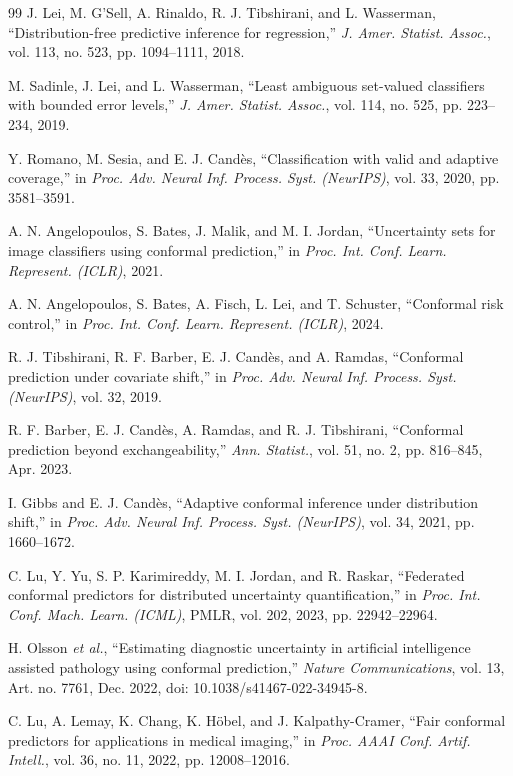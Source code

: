 \documentclass[journal]{IEEEtran}
\begin{document}
\begin{thebibliography}{99}
 J. Lei, M. G'Sell, A. Rinaldo, R. J. Tibshirani, and L. Wasserman, ``Distribution-free predictive inference for regression,'' \emph{J. Amer. Statist. Assoc.}, vol. 113, no. 523, pp. 1094--1111, 2018.

 M. Sadinle, J. Lei, and L. Wasserman, ``Least ambiguous set-valued classifiers with bounded error levels,'' \emph{J. Amer. Statist. Assoc.}, vol. 114, no. 525, pp. 223--234, 2019.

 Y. Romano, M. Sesia, and E. J. Cand\`{e}s, ``Classification with valid and adaptive coverage,'' in \emph{Proc. Adv. Neural Inf. Process. Syst. (NeurIPS)}, vol. 33, 2020, pp. 3581--3591.

 A. N. Angelopoulos, S. Bates, J. Malik, and M. I. Jordan, ``Uncertainty sets for image classifiers using conformal prediction,'' in \emph{Proc. Int. Conf. Learn. Represent. (ICLR)}, 2021.

 A. N. Angelopoulos, S. Bates, A. Fisch, L. Lei, and T. Schuster, ``Conformal risk control,'' in \emph{Proc. Int. Conf. Learn. Represent. (ICLR)}, 2024.

 R. J. Tibshirani, R. F. Barber, E. J. Cand\`{e}s, and A. Ramdas, ``Conformal prediction under covariate shift,'' in \emph{Proc. Adv. Neural Inf. Process. Syst. (NeurIPS)}, vol. 32, 2019.

 R. F. Barber, E. J. Cand\`{e}s, A. Ramdas, and R. J. Tibshirani, ``Conformal prediction beyond exchangeability,'' \emph{Ann. Statist.}, vol. 51, no. 2, pp. 816--845, Apr. 2023.

 I. Gibbs and E. J. Cand\`{e}s, ``Adaptive conformal inference under distribution shift,'' in \emph{Proc. Adv. Neural Inf. Process. Syst. (NeurIPS)}, vol. 34, 2021, pp. 1660--1672.

 C. Lu, Y. Yu, S. P. Karimireddy, M. I. Jordan, and R. Raskar, ``Federated conformal predictors for distributed uncertainty quantification,'' in \emph{Proc. Int. Conf. Mach. Learn. (ICML)}, PMLR, vol. 202, 2023, pp. 22942--22964.

 H. Olsson \emph{et al.}, ``Estimating diagnostic uncertainty in artificial intelligence assisted pathology using conformal prediction,'' \emph{Nature Communications}, vol. 13, Art. no. 7761, Dec. 2022, doi: 10.1038/s41467-022-34945-8.

 C. Lu, A. Lemay, K. Chang, K. H\"{o}bel, and J. Kalpathy-Cramer, ``Fair conformal predictors for applications in medical imaging,'' in \emph{Proc. AAAI Conf. Artif. Intell.}, vol. 36, no. 11, 2022, pp. 12008--12016.


\end{thebibliography}
\end{document}
